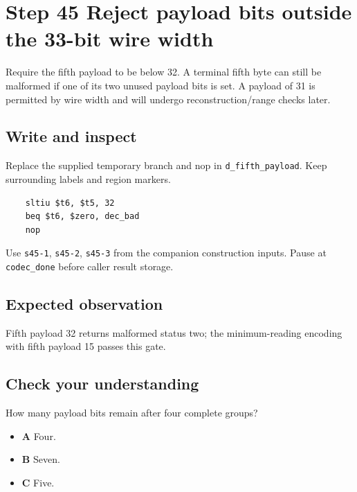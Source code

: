 \section{Step 45 Reject payload bits outside the 33-bit wire width}\label{delta-s45}

Require the fifth payload to be below 32. A terminal fifth byte can still be malformed if one of its two unused payload bits is set. A payload of 31 is permitted by wire width and will undergo reconstruction/range checks later.

\subsection{Write and inspect}
Replace the supplied temporary branch and nop in \texttt{d\_fifth\_payload}. Keep surrounding labels and region markers.

\begin{verbatim}
    sltiu $t6, $t5, 32
    beq $t6, $zero, dec_bad
    nop
\end{verbatim}
Use \texttt{s45-1}, \texttt{s45-2}, \texttt{s45-3} from the companion construction inputs. Pause at \texttt{codec\_done} before caller result storage.

\subsection{Expected observation}
Fifth payload 32 returns malformed status two; the minimum-reading encoding with fifth payload 15 passes this gate.

\subsection{Check your understanding}
How many payload bits remain after four complete groups?

\begin{itemize}
  \item \textbf{A} Four.
  \item \textbf{B} Seven.
  \item \textbf{C} Five.
\end{itemize}
